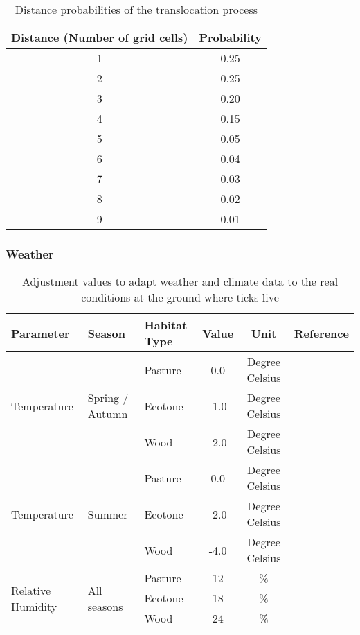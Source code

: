 \documentclass[a4paper, 11pt]{scrartcl}
\begin{document}
\begin{table}[h!]
\caption{Distance probabilities of the translocation process}
\label{tab:distance_probabilities}
\begin{tabular}{@{}cc@{}}
\toprule
\textbf{Distance (Number of grid cells)}	& \textbf{Probability}	\\
\midrule
1 	& 0.25 \\
2	& 0.25 \\
3	& 0.20 \\
4	& 0.15 \\
5	& 0.05 \\
6	& 0.04 \\
7	& 0.03 \\
8	& 0.02 \\
9	& 0.01 \\
\bottomrule
\end{tabular}
\end{table}

\subsubsection{Weather}

\begin{table}[h!]
\caption{Adjustment values to adapt weather and climate data to the real conditions at the ground where ticks live}
\label{tab:micro_climate_adjustments}
\begin{tabular}{@{}lllccl@{}}
\toprule
\textbf{Parameter}					& \textbf{Season} 					& \textbf{Habitat Type}  & \textbf{Value}  	& \textbf{Unit} & \textbf{Reference}  	\\
\midrule
\multirow{3}{*}{Temperature} 		& \multirow{3}{*}{Spring / Autumn}  & Pasture 				 &   0.0   			&   Degree Celsius	&            		    \\
									&									& Ecotone 				 &   -1.0 	  		&   Degree Celsius &	    				\\
									&					 				& Wood    				 &   -2.0   		&   Degree Celsius &	    				\\
\midrule
\multirow{3}{*}{Temperature} 		& \multirow{3}{*}{Summer}        	& Pasture 				 &   0.0    		&	Degree Celsius	&          				\\
									&				 	 				& Ecotone 				 &  -2.0    		&  	Degree Celsius	& ~\cite{Geiger.1995}  	\\
									&				 	 				& Wood	   				 &  -4.0    		&  	Degree Celsius	& ~\cite{Bonan.2016}   	\\
\midrule
\multirow{3}{*}{Relative Humidity}  & \multirow{3}{*}{All seasons}      & Pasture 				 &   12   			&  	\%			&            		    \\
									&				 					& Ecotone 				 &   18    			&   \%    		&					    \\
									&				 					& Wood    				 &   24    			&  	\%			& ~\cite{Boehnke.2017} 	\\
\bottomrule
\end{tabular}
\end{table}



\newpage
\printbibliography[heading = bibintoc, title = {Bibliography}]
\end{document}
